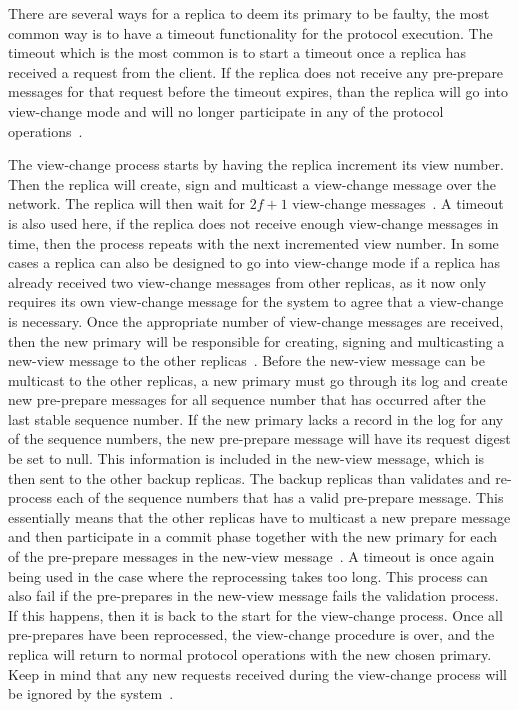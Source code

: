 There are several ways for a replica to deem its primary to be faulty, the most common way is to have a timeout functionality for the protocol execution. The timeout which is the most common is to start a timeout once a replica has received a request from the client. If the replica does not receive any pre-prepare messages for that request before the timeout expires, than the replica will go into view-change mode and will no longer participate in any of the protocol operations~\cites{SLIDES:PBFT}[p.~5-6]{PAPER:OGPBFT}[p.~263]{BOOK:BuildDepDistSyst}.   

The view-change process starts by having the replica increment its view number. Then the replica will create, sign and multicast a view-change message over the network. The replica will then wait for $2f+1$ view-change messages~\cites{SLIDES:PBFT}[p.~6]{PAPER:OGPBFT}[p.~411]{PAPER:PBFTRecovery}{WEB:SawtoothPBFT}. A timeout is also used here, if the replica does not receive enough view-change messages in time, then the process repeats with the next incremented view number. In some cases a replica can also be designed to go into view-change mode if a replica has already received two view-change messages from other replicas, as it now only requires its own view-change message for the system to agree that a view-change is necessary\cite{BOOK:BuildDepDistSyst}. Once the appropriate number of view-change messages are received, then the new primary will be responsible for creating, signing and multicasting a new-view message to the other replicas~\cite[p.~264]{BOOK:BuildDepDistSyst}. Before the new-view message can be multicast to the other replicas, a new primary must go through its log and create new pre-prepare messages for all sequence number that has occurred after the last stable sequence number. If the new primary lacks a record in the log for any of the sequence numbers, the new pre-prepare message will have its request digest be set to null. This information is included in the new-view message, which is then sent to the other backup replicas. The backup replicas than validates and re-process each of the sequence numbers that has a valid pre-prepare message. This essentially means that the other replicas have to multicast a new prepare message and then participate in a commit phase together with the new primary for each of the pre-prepare messages in the new-view message~\cites[p.~6]{PAPER:OGPBFT}[p.~458]{BOOK:MVstandver3}[p.~265]{BOOK:BuildDepDistSyst}. A timeout is once again being used in the case where the reprocessing takes too long. This process can also fail if the pre-prepares in the new-view message fails the validation process. If this happens, then it is back to the start for the view-change process. Once all pre-prepares have been reprocessed, the view-change procedure is over, and the replica will return to normal protocol operations with the new chosen primary. Keep in mind that any new requests received during the view-change process will be ignored by the system~\cite[p.~263]{BOOK:BuildDepDistSyst}.

